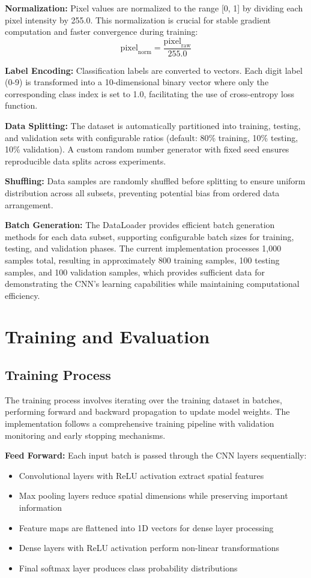 \documentclass[conference]{IEEEtran}
\begin{document}
\textbf{Normalization:} Pixel values are normalized to the range [0, 1] by dividing each pixel intensity by 255.0. This normalization is crucial for stable gradient computation and faster convergence during training:
\begin{equation}
\text{pixel}_{\text{norm}} = \frac{\text{pixel}_{\text{raw}}}{255.0}
\end{equation}

\textbf{Label Encoding:} Classification labels are converted to vectors. Each digit label (0-9) is transformed into a 10-dimensional binary vector where only the corresponding class index is set to 1.0, facilitating the use of cross-entropy loss function.

\textbf{Data Splitting:} The dataset is automatically partitioned into training, testing, and validation sets with configurable ratios (default: 80\% training, 10\% testing, 10\% validation). A custom random number generator with fixed seed ensures reproducible data splits across experiments.

\textbf{Shuffling:} Data samples are randomly shuffled before splitting to ensure uniform distribution across all subsets, preventing potential bias from ordered data arrangement.

\textbf{Batch Generation:} The DataLoader provides efficient batch generation methods for each data subset, supporting configurable batch sizes for training, testing, and validation phases. The current implementation processes 1,000 samples total, resulting in approximately 800 training samples, 100 testing samples, and 100 validation samples, which provides sufficient data for demonstrating the CNN's learning capabilities while maintaining computational efficiency.

\section{Training and Evaluation}
\subsection{Training Process}
The training process involves iterating over the training dataset in batches, performing forward and backward propagation to update model weights. The implementation follows a comprehensive training pipeline with validation monitoring and early stopping mechanisms.

\textbf{Feed Forward:} Each input batch is passed through the CNN layers sequentially:
\begin{itemize}
\item Convolutional layers with ReLU activation extract spatial features
\item Max pooling layers reduce spatial dimensions while preserving important information
\item Feature maps are flattened into 1D vectors for dense layer processing
\item Dense layers with ReLU activation perform non-linear transformations
\item Final softmax layer produces class probability distributions
\end{itemize}
\end{document}
